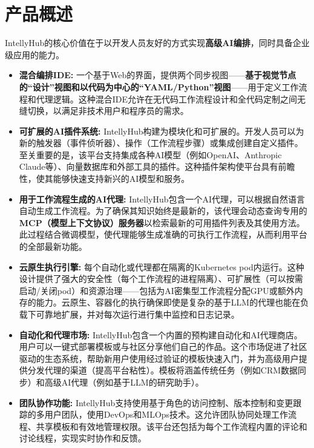 \documentclass[11pt, a4paper, oneside]{article}
\begin{document}
\section{产品概述}
IntellyHub的核心价值在于以开发人员友好的方式实现\textbf{高级AI编排}，同时具备企业级应用的能力。
\begin{itemize}
    \item \textbf{混合编排IDE:} 一个基于Web的界面，提供两个同步视图——\textbf{基于视觉节点的“设计”视图和以代码为中心的“YAML/Python”视图}——用于定义工作流程和代理逻辑。这种混合IDE允许在无代码工作流程设计和全代码定制之间无缝切换，以满足非技术用户和程序员的需求。
    
    \item \textbf{可扩展的AI插件系统:} IntellyHub构建为模块化和可扩展的。开发人员可以为新的触发器（事件侦听器）、操作（工作流程步骤）或集成创建自定义插件。至关重要的是，该平台支持集成各种AI模型（例如OpenAI、Anthropic Claude等）、向量数据库和外部工具的插件。这种插件架构使平台具有前瞻性，使其能够快速支持新兴的AI模型和服务。
    
    \item \textbf{用于工作流程生成的AI代理:} IntellyHub包含一个AI代理，可以根据自然语言自动生成工作流程。为了确保其知识始终是最新的，该代理会动态查询专用的\textbf{MCP（模型上下文协议）服务器}以检索最新的可用插件列表及其使用方法。此过程结合微调模型，使代理能够生成准确的可执行工作流程，从而利用平台的全部最新功能。
    
    \item \textbf{云原生执行引擎:} 每个自动化或代理都在隔离的Kubernetes pod内运行。这种设计提供了强大的安全性（每个工作流程的进程隔离）、可扩展性（可以按需启动/关闭pod）和资源治理——包括为AI密集型工作流程分配GPU或额外内存的能力。云原生、容器化的执行确保即使是复杂的基于LLM的代理也能在负载下可靠地扩展，并对每次运行进行集中监控和日志记录。
    
    \item \textbf{自动化和代理市场:} IntellyHub包含一个内置的预构建自动化和AI代理商店。用户可以一键式部署模板或与社区分享他们自己的作品。这个市场促进了社区驱动的生态系统，帮助新用户使用经过验证的模板快速入门，并为高级用户提供分发代理的渠道（提高平台粘性）。模板将涵盖传统任务（例如CRM数据同步）和高级AI代理（例如基于LLM的研究助手）。
    
    \item \textbf{团队协作功能:} IntellyHub支持使用基于角色的访问控制、版本控制和变更跟踪的多用户团队，使用DevOps和MLOps技术。这允许团队协同处理工作流程、共享模板和有效地管理权限。该平台还包括为每个工作流程内置的评论和讨论线程，实现实时协作和反馈。
\end{itemize}
\end{document}
